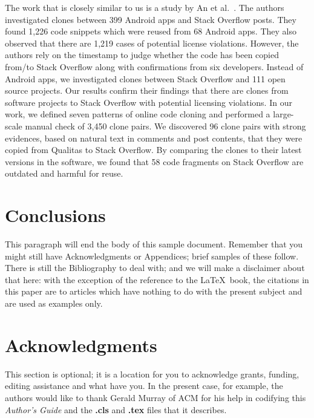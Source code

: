 \documentclass{sig-alternate-05-2015}
\begin{document}
The work that is closely similar to us is a study by An et al.~\cite{An2017}. The authors investigated clones between 399 Android apps and Stack Overflow posts. They found 1,226 code snippets which were reused from 68 Android apps. They also observed that there are 1,219 cases of potential license violations. However, the authors rely on the timestamp to judge whether the code has been copied from/to Stack Overflow along with confirmations from six developers. Instead of Android apps, we investigated clones between Stack Overflow and 111 open source projects. Our results confirm their findings that there are clones from software projects to Stack Overflow with potential licensing violations. In our work, we defined seven patterns of online code cloning and performed a large-scale manual check of 3,450 clone pairs. We discovered 96 clone pairs with strong evidences, based on natural text in comments and post contents, that they were copied from Qualitas to Stack Overflow. By comparing the clones to their latest versions in the software, we found that 58 code fragments on Stack Overflow are outdated and harmful for reuse.

\section{Conclusions}
This paragraph will end the body of this sample document.
Remember that you might still have Acknowledgments or
Appendices; brief samples of these
follow.  There is still the Bibliography to deal with; and
we will make a disclaimer about that here: with the exception
of the reference to the \LaTeX\ book, the citations in
this paper are to articles which have nothing to
do with the present subject and are used as
examples only.

\section{Acknowledgments}
This section is optional; it is a location for you
to acknowledge grants, funding, editing assistance and
what have you.  In the present case, for example, the
authors would like to thank Gerald Murray of ACM for
his help in codifying this \textit{Author's Guide}
and the \textbf{.cls} and \textbf{.tex} files that it describes.
\end{document}
